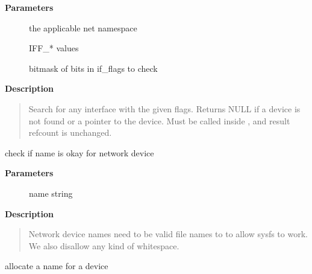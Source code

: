 \documentclass[a4paper,8pt,english]{sphinxmanual}
\begin{document}
\textbf{Parameters}
\begin{description}
\item[{}] \leavevmode
the applicable net namespace

\item[{}] \leavevmode
IFF\_* values

\item[{}] \leavevmode
bitmask of bits in if\_flags to check

\end{description}

\textbf{Description}
\begin{quote}

Search for any interface with the given flags. Returns NULL if a device
is not found or a pointer to the device. Must be called inside
, and result refcount is unchanged.
\end{quote}

\begin{fulllineitems}
\label{networking/kapi:c.dev_valid_name}
check if name is okay for network device

\end{fulllineitems}


\textbf{Parameters}
\begin{description}
\item[{}] \leavevmode
name string

\end{description}

\textbf{Description}
\begin{quote}

Network device names need to be valid file names to
to allow sysfs to work.  We also disallow any kind of
whitespace.
\end{quote}

\begin{fulllineitems}
\label{networking/kapi:c.dev_alloc_name}
allocate a name for a device

\end{fulllineitems}
\end{document}
